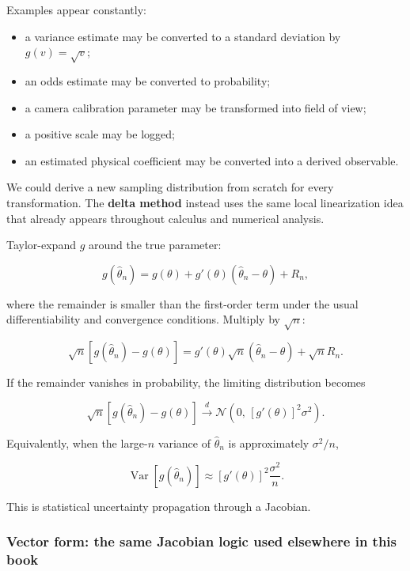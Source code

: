 Examples appear constantly:

\begin{itemize}
\tightlist
\item
  a variance estimate may be converted to a standard deviation by \(g(v)=\sqrt v\);
\item
  an odds estimate may be converted to probability;
\item
  a camera calibration parameter may be transformed into field of view;
\item
  a positive scale may be logged;
\item
  an estimated physical coefficient may be converted into a derived observable.
\end{itemize}

We could derive a new sampling distribution from scratch for every transformation. The \textbf{delta method} instead uses the same local linearization idea that already appears throughout calculus and numerical analysis.

Taylor-expand \(g\) around the true parameter:

\[
g(\widehat\theta_n)
=
g(\theta)
+
g'(\theta)(\widehat\theta_n-\theta)
+
R_n,
\]

where the remainder is smaller than the first-order term under the usual differentiability and convergence conditions. Multiply by \(\sqrt n\):

\[
\sqrt n
\left[
g(\widehat\theta_n)-g(\theta)
\right]
=
g'(\theta)
\sqrt n(\widehat\theta_n-\theta)
+
\sqrt nR_n.
\]

If the remainder vanishes in probability, the limiting distribution becomes

\[
\boxed{
\sqrt n
\left[
g(\widehat\theta_n)-g(\theta)
\right]
\xrightarrow{d}
\mathcal N
\left(
0,\,
[g'(\theta)]^2\sigma^2
\right)
}.
\]

Equivalently, when the large-\(n\) variance of \(\widehat\theta_n\) is approximately \(\sigma^2/n\),

\[
\operatorname{Var}\!\left[g(\widehat\theta_n)\right]
\approx
[g'(\theta)]^2
\frac{\sigma^2}{n}.
\]

This is statistical uncertainty propagation through a Jacobian.

\subsubsection{Vector form: the same Jacobian logic used elsewhere in this book}\label{02-foundations-ii-ch030-vector-form-the-same-jacobian-logic-used-elsewhere-in-this-book}

